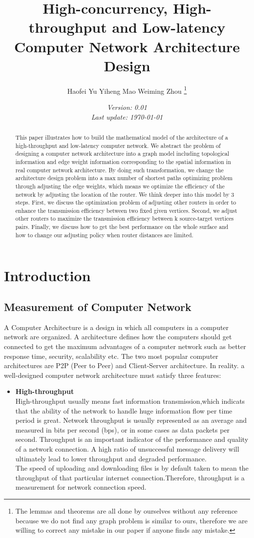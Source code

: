 \documentclass{elegantpaper}
\title{High-concurrency, High-throughput and Low-latency Computer Network Architecture Design}
\author{{\quad Haofei Yu  \quad\quad\quad\quad\quad\quad Yiheng Mao  \quad\quad\quad\quad  Weiming Zhou} 	\thanks{The lemmas and theorems are all done by ourselves without any reference because we do not find any graph problem is similar to ours, therefore we are willing to correct any mistake in our paper if anyone finds any mistake.}\\ {\email{3180102099@zju.edu.cn}\quad   \email{3180103727@zju.edu.cn} \quad  \email{3180105414@zju.edu.cn}} %
	}
\date{\small\itshape Version: 0.01 \\ Last update: \today}
\begin{document}
\maketitle

\begin{abstract}
	This paper illustrates how to build the mathematical model of the architecture of a high-throughput and low-latency computer network. We abstract the problem of designing a computer network architecture into a graph model including topological information and edge weight information corresponding to the spatial information in real computer network architecture. By doing such transformation, we change the architecture design problem into a max number of shortest paths optimizing problem through adjusting the edge weights, which means we optimize the efficiency of the network by adjusting the location of the router. We think deeper into this model by 3 steps. First, we discuss the  optimization problem of adjusting other routers in order to enhance the transmission efficiency between two fixed given vertices. Second, we adjust other routers to maximize the transmission efficiency between k source-target vertices pairs. Finally, we discuss how to get the best performance on the whole surface and how to change our adjusting policy when router distances are limited.
\end{abstract}

\section{Introduction} 
\subsection{Measurement of Computer Network}
A Computer Architecture is a design in which all computers in a computer network are organized. A architecture defines how the computers should get connected to get the maximum advantages of a computer network such as better response time, security, scalability etc. The two most popular computer architectures are P2P (Peer to Peer) and Client-Server architecture.
In reality. a well-designed computer network architecture must satisfy three features:\\
\begin{itemize}[noitemsep]\item\textbf{High-throughput}\\
High-throughput usually means fast information transmission,which indicats that the ability of the network to handle huge information flow per time period is great.
Network throughput is usually represented as an average and measured in bits per second (bps), or in some cases as data packets per second. Throughput is an important indicator of the performance and quality of a network connection. A high ratio of unsuccessful message delivery will ultimately lead to lower throughput and degraded performance.\\
The speed of uploading and downloading files is by default taken to mean the throughput of that particular internet connection.Therefore, throughput is a measurement for network connection speed.
\end{itemize}
\end{document}
